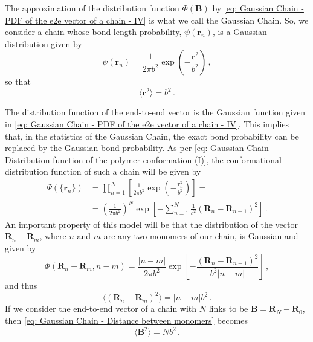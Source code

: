 \documentclass[../../main.tex]{subfiles}
\begin{document}
    The approximation of the distribution function $\Phi(\mathbf{B})$ by \cref{eq: Gaussian Chain - PDF of the e2e vector of a chain - IV} is what we call the Gaussian Chain. So, we consider a chain whose bond length probability, $\psi(\mathbf{r}_n)$, is a Gaussian distribution given by
        \begin{equation}\label{eq: Gaussian Chain - Distribution of a random bond vector}
           \psi(\mathbf{r}_n) = \frac{1}{2\pi b^2} \exp\left( -\frac{\mathbf{r}^2}{b^2} \right) \,,
        \end{equation}
    so that
        \begin{equation}
            \langle \mathbf{r}^2 \rangle = b^2 \,.
        \end{equation}
        
    The distribution function of the end-to-end vector is the Gaussian function given in \cref{eq: Gaussian Chain - PDF of the e2e vector of a chain - IV}. This implies that, in the statistics of the Gaussian Chain, the exact bond probability can be replaced by the Gaussian bond probability. As per \cref{eq: Gaussian Chain - Distribution function of the polymer conformation (I)}, the conformational distribution function of such a chain will be given by
        \begin{equation}\label{eq: Gaussian Chain - Distribution function of the polymer conformation (II)}
        \begin{split}
            \Psi(\{\mathbf{r}_n\}) &= \prod_{n = 1}^N\left[\frac{1}{2\pi b^2} \exp\left( -\frac{\mathbf{r}_n^2}{b^2} \right)\right] =\\
            &= \left( \frac{1}{2\pi b^2} \right)^{N} \exp\left[ -\sum_{n=1}^N \frac{1}{b^2} \left(\mathbf{R}_n-\mathbf{R}_{n-1}\right)^2 \right] \,.
        \end{split}
        \end{equation}
    An important property of this model will be that the distribution of the vector $\mathbf{R}_n - \mathbf{R}_m$, where $n$ and $m$ are any two monomers of our chain, is Gaussian and given by
        \begin{equation}\label{eq: Gaussian Chain - PDF of some vector of the chain}
            \Phi(\mathbf{R}_n - \mathbf{R}_m, n-m) = \frac{\lvert n-m \rvert}{2\pi b^2} \exp\left[ -\frac{\left(\mathbf{R}_n-\mathbf{R}_{n-1}\right)^2}{b^2\lvert n-m \rvert} \right] \,,
        \end{equation}
    and thus
        \begin{equation}\label{eq: Gaussian Chain - Distance between monomers}
            \langle (\mathbf{R}_n - \mathbf{R}_m)^2 \rangle = \lvert n-m \rvert b^2 \,.
        \end{equation}
    If we consider the end-to-end vector of a chain with $N$ links to be $\mathbf{B} = \mathbf{R}_N - \mathbf{R}_0$, then \cref{eq: Gaussian Chain - Distance between monomers} becomes
        \begin{equation}
            \langle \mathbf{B}^2 \rangle = N b^2 \,.
        \end{equation}
    
\end{document}
